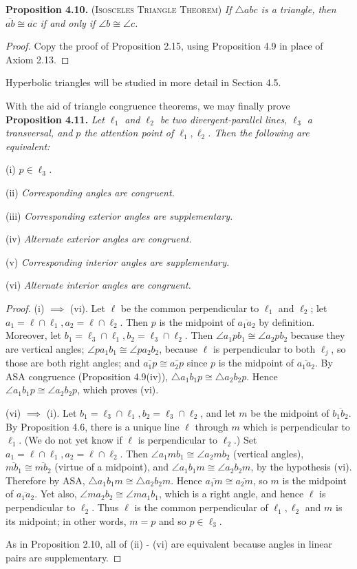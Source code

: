 \documentclass[leqno]{book}
\begin{document}
\noindent\textbf{Proposition 4.10.} \textsc{(Isosceles Triangle Theorem)} \emph{If $\triangle abc$ is a triangle, then $\overline{ab}\cong\overline{ac}$ if and only if $\angle b\cong\angle c$.}
\begin{proof}
Copy the proof of Proposition 2.15, using Proposition 4.9 in place of Axiom 2.13.
\end{proof}

\noindent Hyperbolic triangles will be studied in more detail in Section 4.5.

With the aid of triangle congruence theorems, we may finally prove\\

\noindent\textbf{Proposition 4.11.} \emph{Let $\ell_1$ and $\ell_2$ be two divergent-parallel lines, $\ell_3$ a transversal, and $p$ the attention point of $\ell_1,\ell_2$.  Then the following are equivalent:}

(i) \emph{$p\in\ell_3$.}

(ii) \emph{Corresponding angles are congruent.}

(iii) \emph{Corresponding exterior angles are supplementary.}

(iv) \emph{Alternate exterior angles are congruent.}

(v) \emph{Corresponding interior angles are supplementary.}

(vi) \emph{Alternate interior angles are congruent.}
\begin{proof}
(i) $\implies$ (vi). Let $\ell$ be the common perpendicular to $\ell_1$ and $\ell_2$; let $a_1=\ell\cap\ell_1,a_2=\ell\cap\ell_2$.  Then $p$ is the midpoint of $\overline{a_1a_2}$ by definition.  Moreover, let $b_1=\ell_3\cap\ell_1,b_2=\ell_3\cap\ell_2$.  Then $\angle a_1pb_1\cong\angle a_2pb_2$ because they are vertical angles; $\angle pa_1b_1\cong\angle pa_2b_2$, because $\ell$ is perpendicular to both $\ell_j$, so those are both right angles; and $\overline{a_1p}\cong\overline{a_2p}$ since $p$ is the midpoint of $\overline{a_1a_2}$.  By ASA congruence (Proposition 4.9(iv)), $\triangle a_1b_1p\cong\triangle a_2b_2p$.  Hence $\angle a_1b_1p\cong\angle a_2b_2p$, which proves (vi).

(vi) $\implies$ (i). Let $b_1=\ell_3\cap\ell_1,b_2=\ell_3\cap\ell_2$, and let $m$ be the midpoint of $\overline{b_1b_2}$.  By Proposition 4.6, there is a unique line $\ell$ through $m$ which is perpendicular to $\ell_1$.  (We do not yet know if $\ell$ is perpendicular to $\ell_2$.)  Set $a_1=\ell\cap\ell_1,a_2=\ell\cap\ell_2$.  Then $\angle a_1mb_1\cong\angle a_2mb_2$ (vertical angles), $\overline{mb_1}\cong\overline{mb_2}$ (virtue of a midpoint), and $\angle a_1b_1m\cong\angle a_2b_2m$, by the hypothesis (vi).  Therefore by ASA, $\triangle a_1b_1m\cong\triangle a_2b_2m$.  Hence $\overline{a_1m}\cong\overline{a_2m}$, so $m$ is the midpoint of $\overline{a_1a_2}$.  Yet also, $\angle ma_2b_2\cong\angle ma_1b_1$, which is a right angle, and hence $\ell$ is perpendicular to $\ell_2$.  Thus $\ell$ is the common perpendicular of $\ell_1,\ell_2$ and $m$ is its midpoint; in other words, $m=p$ and so $p\in\ell_3$.

As in Proposition 2.10, all of (ii) - (vi) are equivalent because angles in linear pairs are supplementary.
\end{proof}
\end{document}
